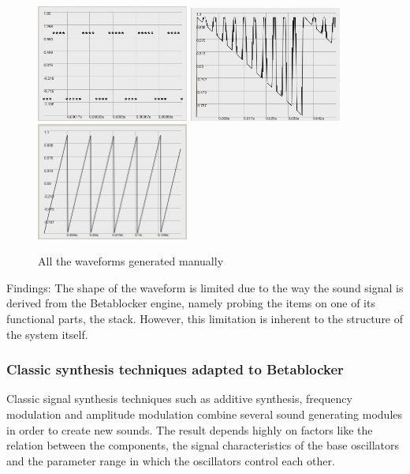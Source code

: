 \documentclass[letterpaper, 12pt]{article}
\begin{document}
\begin{figure}
		\includegraphics[width=5cm]{wv-pulse22}
		\includegraphics[width=5cm]{wv-sawImpulse}
		\includegraphics[width=5cm]{wv-sawtooth}
	\caption{All the waveforms generated manually}
	\label{fig:fig_waveforms_POPdestroy-random}
\end{figure}


Findings: The shape of the waveform is limited due to the way the sound signal is derived from the Betablocker engine, namely probing the items on one of its functional parts, the stack. 
However, this limitation is inherent to the structure of the system itself.





\subsubsection{Classic synthesis techniques adapted to Betablocker} %
\label{sub:classic_synthesis_techniques_adapted_to_betablocker}

Classic signal synthesis techniques such as additive synthesis, frequency modulation and amplitude modulation combine several sound generating modules in order to create new sounds.
The result depends highly on factors like the relation between the components, the signal characteristics of the base oscillators and the parameter range in which the oscillators control each other.
\end{document}
